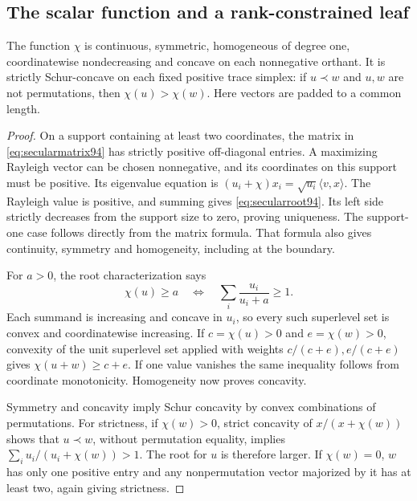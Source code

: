 \subsection{The scalar function and a rank-constrained leaf}
\begin{lemma}\label{lem:secular94}
The function $\chi$ is continuous, symmetric, homogeneous of degree one,
coordinatewise nondecreasing and concave on each nonnegative orthant.
It is strictly Schur-concave on each fixed positive trace simplex:
if $u\prec w$ and $u,w$ are not permutations, then
$\chi(u)>\chi(w)$.  Here vectors are padded to a common length.
\end{lemma}
\begin{proof}
On a support containing at least two coordinates, the matrix in
\eqref{eq:secularmatrix94} has strictly positive off-diagonal entries.
A maximizing Rayleigh vector can be chosen nonnegative, and its
coordinates on this support must be positive.  Its eigenvalue equation
is $(u_i+\chi)x_i=\sqrt{u_i}\langle v,x\rangle$.
The Rayleigh value is positive, and summing gives
\eqref{eq:secularroot94}.  Its left side strictly decreases from the
support size to zero, proving uniqueness.  The support-one case follows
directly from the matrix formula.  That formula also gives continuity,
symmetry and homogeneity, including at the boundary.

For $a>0$, the root characterization says
\[
 \chi(u)\ge a\quad\Longleftrightarrow\quad
                     \sum_i\frac{u_i}{u_i+a}\ge1.
\]
Each summand is increasing and concave in $u_i$, so every such
superlevel set is convex and coordinatewise increasing.  If
$c=\chi(u)>0$ and $e=\chi(w)>0$, convexity of the unit superlevel set
applied with weights $c/(c+e),e/(c+e)$ gives
$\chi(u+w)\ge c+e$.  If one value vanishes the same inequality follows
from coordinate monotonicity.  Homogeneity now proves concavity.

Symmetry and concavity imply Schur concavity by convex combinations of
permutations.  For strictness, if $\chi(w)>0$, strict concavity of
$x/(x+\chi(w))$ shows that $u\prec w$, without permutation equality,
implies
$\sum_i u_i/(u_i+\chi(w))>1$.  The root for $u$ is therefore larger.
If $\chi(w)=0$, $w$ has only one positive entry and any nonpermutation
vector majorized by it has at least two, again giving strictness.
\end{proof}

